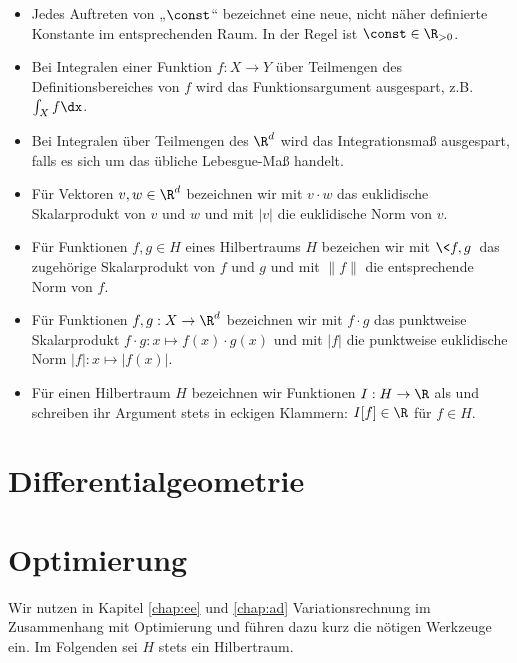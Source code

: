 \documentclass{mythesis}
\begin{document}
\begin{itemize}
    \item
	Jedes Auftreten von „$\const$“ bezeichnet eine neue, nicht näher definierte Konstante im entsprechenden Raum.
	In der Regel ist $\const \in \R_{>0}$.
    \item
	Bei Integralen einer Funktion $f: X \to Y$ über Teilmengen des Definitionsbereiches von $f$ wird das Funktionsargument ausgespart, z.B. $\int_X f \dx$.
    \item
	Bei Integralen über Teilmengen des $\R^d$ wird das Integrationsmaß ausgespart, falls es sich um das übliche Lebesgue-Maß handelt.
    \item
	Für Vektoren $v, w \in \R^d$ bezeichnen wir mit $v \cdot w$ das euklidische Skalarprodukt von $v$ und $w$ und mit $|v|$ die euklidische Norm von $v$.
    \item
	Für Funktionen $f, g \in H$ eines Hilbertraums $H$ bezeichen wir mit $\<f, g\>$ das zugehörige Skalarprodukt von $f$ und $g$ und mit $\|f\|$ die entsprechende Norm von $f$.
    \item
	Für Funktionen $f, g: X \to \R^d$ bezeichnen wir mit $f \cdot g$ das punktweise Skalarprodukt $f \cdot g: x \mapsto f(x)\cdot g(x)$ und mit $|f|$ die punktweise euklidische Norm $|f|: x \mapsto |f(x)|$.
    \item
	Für einen Hilbertraum $H$ bezeichnen wir Funktionen $I: H \to \R$ als  und schreiben ihr Argument stets in eckigen Klammern: $I[f] \in \R$ für $f \in H$.
\end{itemize}


\section*{Differentialgeometrie}


\section*{Optimierung}

Wir nutzen in Kapitel \ref{chap:ee} und \ref{chap:ad} Variationsrechnung im Zusammenhang mit Optimierung und führen dazu kurz die nötigen Werkzeuge ein.
Im Folgenden sei $H$ stets ein Hilbertraum.
\end{document}
